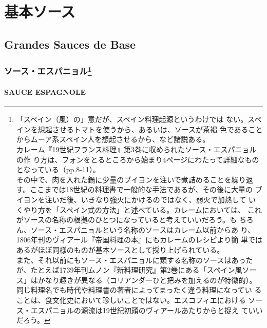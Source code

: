 \hypertarget{ux57faux672cux30bdux30fcux30b9}{%
\section{基本ソース}\label{ux57faux672cux30bdux30fcux30b9}}

\hypertarget{grandes-sauces-de-base}{%
\subsection{Grandes Sauces de Base}\label{grandes-sauces-de-base}}

\maeaki

\hypertarget{ux30bdux30fcux30b9ux30a8ux30b9ux30d1ux30cbux30e7ux30eb102008}{%
\subsubsection[ソース・エスパニョル]{\texorpdfstring{ソース・エスパニョル\footnote{「スペイン（風）の」意だが、スペイン料理起源というわけでは
  ない。スペインを想起させるトマトを使うから、あるいは、ソースが茶褐
  色であることからムーア系スペイン人を想起させるから、など諸説ある。\\
  カレーム『19世紀フランス料理』第3巻に収められたソース・エスパニョルの作
  り方は、フォンをとるところから始まり4ページにわたって詳細なものとなっている（pp.8-11）。\\
  その中で、肉を入れた鍋に少量のブイヨンを注いで煮詰めることを繰り返
  す。ここまでは18世紀の料理書で一般的な手法であるが、その後に大量の
  ブイヨンを注いだ後、いきなり強火にかけるのではなく、弱火で加熱して
  いくやり方を「スペイン式の方法」と述べている。カレームにおいては、
  これがソースの名称の根拠のひとつになっていると考えていいだろう。も
  ちろん、ソース・エスパニョルという名称のソースはカレーム以前からあ
  り、1806年刊のヴィアール『帝国料理の本』にもカレームのレシピより簡
  単ではあるがほぼ同様のものが基本ソースとして採り上げられている。\\
  また、それ以前にもソース・エスパニョルに類する名称のソースはあった
  が、たとえば1739年刊ムノン『新料理研究』第2巻にある「スペイン風ソー
  ス」はかなり趣きが異なる（コリアンダーひと把みを加えるのが特徴的）。
  同じ料理名でも時代や料理書の著者によってまったく違う料理になってい
  ることは、食文化史において珍しいことではない。エスコフィエにおける
  ソース・エスパニョルの源流は19世紀初頭のヴィアールあたりからと捉え
  ていいだろう。}}{ソース・エスパニョル}}\label{ux30bdux30fcux30b9ux30a8ux30b9ux30d1ux30cbux30e7ux30eb102008}}

\hypertarget{sauce-espagnole}{%
\paragraph{SAUCE ESPAGNOLE}\label{sauce-espagnole}}

